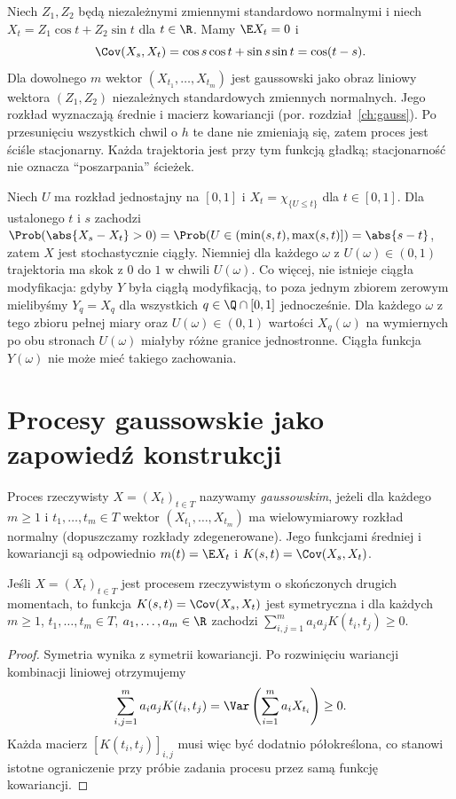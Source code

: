 \begin{przyklad}
Niech $Z_1,Z_2$ będą niezależnymi zmiennymi standardowo normalnymi
i niech $X_t=Z_1\cos t+Z_2\sin t$ dla $t\in\R$.
Mamy $\E X_t=0$ i
\[
\Cov(X_s,X_t)=\cos s\cos t+\sin s\sin t=\cos(t-s).
\]
Dla dowolnego $m$ wektor $(X_{t_1},\ldots,X_{t_m})$
jest gaussowski jako obraz liniowy wektora
$(Z_1,Z_2)$ niezależnych standardowych zmiennych normalnych.
Jego rozkład wyznaczają średnie i macierz kowariancji
(por. rozdział~\ref{ch:gauss}).
Po przesunięciu wszystkich chwil o $h$ te dane nie zmieniają się,
zatem proces jest ściśle stacjonarny. Każda trajektoria jest przy
tym funkcją gładką; stacjonarność nie oznacza ``poszarpania'' ścieżek.
\end{przyklad}

\begin{przyklad}
Niech $U$ ma rozkład jednostajny na $[0,1]$ i
$X_t=\chi_{\{U\le t\}}$ dla $t\in[0,1]$.
Dla ustalonego $t$ i $s$ zachodzi
$\Prob(\abs{X_s-X_t}>0)=\Prob(U\in(\min(s,t),\max(s,t)])
=\abs{s-t}$, zatem $X$ jest stochastycznie ciągły.
Niemniej dla każdego $\omega$ z $U(\omega)\in(0,1)$
trajektoria ma skok z $0$ do $1$ w chwili $U(\omega)$.
Co więcej, nie istnieje ciągła modyfikacja: gdyby $Y$ była ciągłą
modyfikacją, to poza jednym zbiorem zerowym mielibyśmy
$Y_q=X_q$ dla wszystkich $q\in\Q\cap[0,1]$ jednocześnie.
Dla każdego $\omega$ z tego zbioru pełnej miary oraz
$U(\omega)\in(0,1)$ wartości $X_q(\omega)$ na wymiernych
po obu stronach $U(\omega)$ miałyby różne granice jednostronne.
Ciągła funkcja $Y(\omega)$ nie może mieć takiego zachowania.
\end{przyklad}

\section{Procesy gaussowskie jako zapowiedź konstrukcji}
\begin{definicja}
Proces rzeczywisty $X=(X_t)_{t\in T}$ nazywamy
\emph{gaussowskim}, jeżeli dla każdego $m\ge1$
i $t_1,\ldots,t_m\in T$ wektor
$(X_{t_1},\ldots,X_{t_m})$ ma wielowymiarowy rozkład
normalny (dopuszczamy rozkłady zdegenerowane).
Jego funkcjami średniej i kowariancji są odpowiednio
$m(t)=\E X_t$ i $K(s,t)=\Cov(X_s,X_t)$.
\end{definicja}

\begin{stwierdzenie}
Jeśli $X=(X_t)_{t\in T}$ jest procesem rzeczywistym o
skończonych drugich momentach, to funkcja
$K(s,t)=\Cov(X_s,X_t)$ jest symetryczna i dla każdych
$m\ge1$, $t_1,\ldots,t_m\in T$, $a_1,\ldots,a_m\in\R$
zachodzi
$\sum_{i,j=1}^m a_i a_j K(t_i,t_j)\ge0$.
\end{stwierdzenie}
\begin{proof}
Symetria wynika z symetrii kowariancji. Po rozwinięciu
wariancji kombinacji liniowej otrzymujemy
\[
\sum_{i,j=1}^m a_i a_j K(t_i,t_j)
=\Var\left(\sum_{i=1}^m a_i X_{t_i}\right)\ge0.
\]
Każda macierz $[K(t_i,t_j)]_{i,j}$ musi więc być dodatnio
półokreślona, co stanowi istotne ograniczenie przy próbie
zadania procesu przez samą funkcję kowariancji.
\end{proof}

